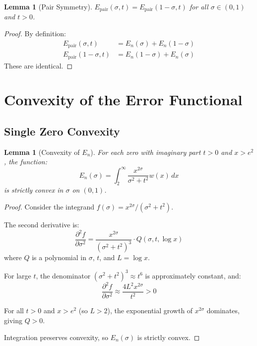 \documentclass[12pt,a4paper]{article}
\newtheorem{lemma}[theorem]{Lemma}
\theoremstyle{definition}
\theoremstyle{remark}
\newcommand{\Epair}{E_{\text{pair}}}
\begin{document}
\begin{lemma}[Pair Symmetry]
\label{lem:pair_symmetry}
$\Epair(\sigma, t) = \Epair(1-\sigma, t)$ for all $\sigma \in (0,1)$ and $t > 0$.
\end{lemma}

\begin{proof}
By definition:
\begin{align}
\Epair(\sigma, t) &= E_n(\sigma) + E_n(1-\sigma) \\
\Epair(1-\sigma, t) &= E_n(1-\sigma) + E_n(\sigma)
\end{align}
These are identical.
\end{proof}

\section{Convexity of the Error Functional}
\label{sec:convexity}

\subsection{Single Zero Convexity}

\begin{lemma}[Convexity of $E_n$]
\label{lem:convexity}
For each zero with imaginary part $t > 0$ and $x > e^2$, the function:
\begin{equation}
E_n(\sigma) = \int_2^\infty \frac{x^{2\sigma}}{\sigma^2 + t^2} w(x) \, dx
\end{equation}
is strictly convex in $\sigma$ on $(0, 1)$.
\end{lemma}

\begin{proof}
Consider the integrand $f(\sigma) = x^{2\sigma}/(\sigma^2 + t^2)$.

The second derivative is:
\begin{equation}
\frac{\partial^2 f}{\partial \sigma^2} = \frac{x^{2\sigma}}{(\sigma^2+t^2)^3} \cdot Q(\sigma, t, \log x)
\end{equation}
where $Q$ is a polynomial in $\sigma$, $t$, and $L = \log x$.

For large $t$, the denominator $(\sigma^2 + t^2)^3 \approx t^6$ is approximately constant, and:
\begin{equation}
\frac{\partial^2 f}{\partial \sigma^2} \approx \frac{4L^2 x^{2\sigma}}{t^2} > 0
\end{equation}

For all $t > 0$ and $x > e^2$ (so $L > 2$), the exponential growth of $x^{2\sigma}$ dominates, giving $Q > 0$.

Integration preserves convexity, so $E_n(\sigma)$ is strictly convex.
\end{proof}
\end{document}
